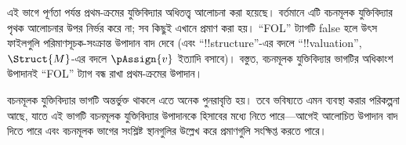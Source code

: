 \documentclass[../../include/open-logic-part]{subfiles}
\begin{document}

\begin{editorial}
  এই ভাগে পূর্ণতা পর্যন্ত প্রথম-ক্রমের যুক্তিবিদ্যার অধিতত্ত্ব আলোচনা করা
  হয়েছে। বর্তমানে এটি বচনমূলক যুক্তিবিদ্যার পৃথক আলোচনার উপর নির্ভর করে
  না; সব কিছুই এখানে প্রমাণ করা হয়। “FOL” ট্যাগটি false হলে উৎস ফাইলগুলি
  পরিমাণসূচক-সংক্রান্ত উপাদান বাদ দেবে (এবং “!!{structure}”-এর বদলে
  “!!{valuation}”, $\Struct{M}$-এর বদলে $\pAssign{v}$ ইত্যাদি বসাবে)।
  বস্তুত, বচনমূলক যুক্তিবিদ্যার ভাগটির অধিকাংশ উপাদানই “FOL” ট্যাগ বন্ধ
  রাখা প্রথম-ক্রমের উপাদান।

  বচনমূলক যুক্তিবিদ্যার ভাগটি অন্তর্ভুক্ত থাকলে এতে অনেক পুনরাবৃত্তি হয়।
  তবে ভবিষ্যতে এমন ব্যবস্থা করার পরিকল্পনা আছে, যাতে এই ভাগটি বচনমূলক
  যুক্তিবিদ্যার উপাদানকে হিসাবের মধ্যে নিতে পারে—আগেই আলোচিত উপাদান বাদ
  দিতে পারে এবং বচনমূলক ভাগের সংশ্লিষ্ট স্থানগুলির উল্লেখ করে প্রমাণগুলি
  সংক্ষিপ্ত করতে পারে।
\end{editorial}












\OLEndPartHook
\end{document}
